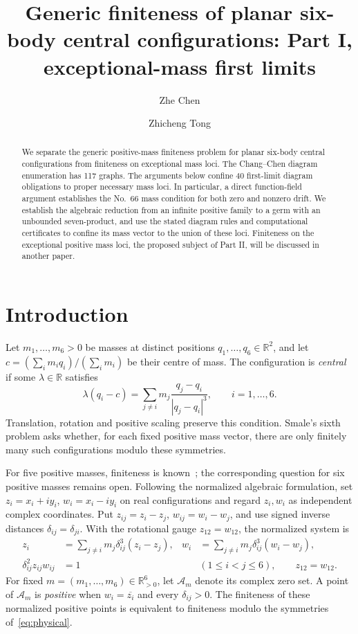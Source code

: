 \documentclass[11pt]{amsart}
\title[Six-body central configurations, Part I]{Generic finiteness of planar six-body central configurations: Part I, exceptional-mass first limits}
\author{Zhe Chen}
\author{Zhicheng Tong}
\theoremstyle{remark}
\newcommand{\A}{\mathcal A}
\begin{document}
\begin{abstract}
We separate the generic positive-mass finiteness problem for planar six-body central configurations from finiteness on exceptional mass loci. The Chang--Chen diagram enumeration has 117 graphs. The arguments below confine 40 first-limit diagram obligations to proper necessary mass loci. In particular, a direct function-field argument establishes the No.~66 mass condition for both zero and nonzero drift. We establish the algebraic reduction from an infinite positive family to a germ with an unbounded seven-product, and use the stated diagram rules and computational certificates to confine its mass vector to the union of these loci. Finiteness on the exceptional positive mass loci, the proposed subject of Part II, will be discussed in another paper.
\end{abstract}
\maketitle
\tableofcontents

\section{Introduction}\label{sec:intro}
Let $m_1,\ldots,m_6>0$ be masses at distinct positions $q_1,\ldots,q_6\in\mathbb R^2$, and let $c=(\sum_i m_iq_i)/(\sum_i m_i)$ be their centre of mass. The configuration is \emph{central} if some $\lambda\in\mathbb R$ satisfies
\begin{equation}\label{eq:physical}
\lambda(q_i-c)=\sum_{j\ne i}m_j\frac{q_j-q_i}{|q_j-q_i|^3},\qquad i=1,\ldots,6.
\end{equation}
Translation, rotation and positive scaling preserve this condition. Smale's sixth problem asks whether, for each fixed positive mass vector, there are only finitely many such configurations modulo these symmetries.

For five positive masses, finiteness is known~\cite{CTFive,FiveT}; the corresponding question for six positive masses remains open. Following the normalized algebraic formulation, set $z_i=x_i+iy_i$, $w_i=x_i-iy_i$ on real configurations and regard $z_i,w_i$ as independent complex coordinates. Put $z_{ij}=z_i-z_j$, $w_{ij}=w_i-w_j$, and use signed inverse distances $\delta_{ij}=\delta_{ji}$. With the rotational gauge $z_{12}=w_{12}$, the normalized system is
\begin{equation}\label{eq:AK}
\begin{aligned}
z_i&=\sum_{j\ne i}m_j\delta_{ij}^3(z_i-z_j),&
 w_i&=\sum_{j\ne i}m_j\delta_{ij}^3(w_i-w_j),\\
\delta_{ij}^2z_{ij}w_{ij}&=1 &&(1\le i<j\le6),\qquad z_{12}=w_{12}.
\end{aligned}
\end{equation}
For fixed $m=(m_1,\ldots,m_6)\in\mathbb R_{>0}^6$, let $\A_m$ denote its complex zero set. A point of $\A_m$ is \emph{positive} when $w_i=\overline{z_i}$ and every $\delta_{ij}>0$. The finiteness of these normalized positive points is equivalent to finiteness modulo the symmetries of~\eqref{eq:physical}.
\end{document}
